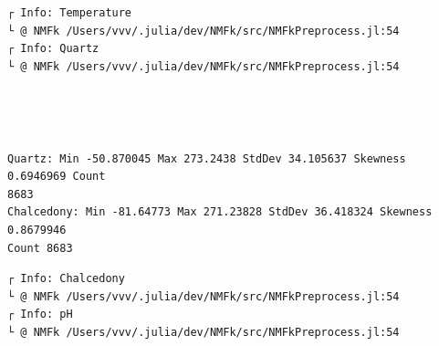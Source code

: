 \documentclass[11pt]{article}
\begin{document}
    \begin{Verbatim}[commandchars=\\\{\}]
┌ Info: Temperature
└ @ NMFk /Users/vvv/.julia/dev/NMFk/src/NMFkPreprocess.jl:54
┌ Info: Quartz
└ @ NMFk /Users/vvv/.julia/dev/NMFk/src/NMFkPreprocess.jl:54
    \end{Verbatim}

    \begin{center}
    \end{center}
    { \hspace*{\fill} \\}
    
    \begin{center}
    \end{center}
    { \hspace*{\fill} \\}
    
    \begin{Verbatim}[commandchars=\\\{\}]
Quartz: Min -50.870045 Max 273.2438 StdDev 34.105637 Skewness 0.6946969 Count
8683
Chalcedony: Min -81.64773 Max 271.23828 StdDev 36.418324 Skewness 0.8679946
Count 8683
    \end{Verbatim}

    \begin{Verbatim}[commandchars=\\\{\}]
┌ Info: Chalcedony
└ @ NMFk /Users/vvv/.julia/dev/NMFk/src/NMFkPreprocess.jl:54
┌ Info: pH
└ @ NMFk /Users/vvv/.julia/dev/NMFk/src/NMFkPreprocess.jl:54
    \end{Verbatim}

    \begin{center}
    \end{center}
    { \hspace*{\fill} \\}
    
    \begin{center}
    \end{center}
    { \hspace*{\fill} \\}
    
\end{document}
